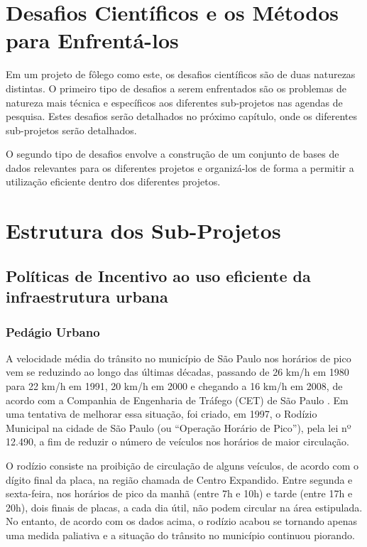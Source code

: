 \documentclass[
	12pt,				%
	openright,			%
	twoside,			%
	a4paper,			%
	english,			%
	french,				%
	spanish,			%
	brazil,				%
	]{abntex2}
\begin{document}
%

\chapter{Desafios Científicos e os Métodos para Enfrentá-los}

Em um projeto de fôlego como este, os desafios científicos são de duas naturezas distintas. O primeiro tipo de desafios a serem enfrentados são os problemas de natureza mais técnica e específicos aos diferentes sub-projetos nas agendas de pesquisa. Estes desafios serão detalhados no próximo capítulo, onde os diferentes sub-projetos serão detalhados.

O segundo tipo de desafios envolve a construção de um conjunto de bases de dados relevantes para os diferentes projetos e organizá-los de forma a permitir a utilização eficiente dentro dos diferentes projetos. 

\chapter{Estrutura dos Sub-Projetos}


\section{Políticas de Incentivo ao uso eficiente da infraestrutura urbana}



\subsection*{Pedágio Urbano}

A velocidade média do trânsito no município de São Paulo nos horários de pico vem se reduzindo ao longo das últimas décadas, passando de 26 km/h em 1980 para 22 km/h em 1991, 20 km/h em 2000 e chegando a 16 km/h em 2008, de acordo com a Companhia de Engenharia de Tráfego (CET) de São Paulo . Em uma tentativa de melhorar essa situação, foi criado, em 1997, o Rodízio Municipal na cidade de São Paulo (ou “Operação Horário de Pico”), pela lei  nº 12.490, a fim de reduzir o número de veículos nos horários de maior circulação.

O  rodízio consiste na proibição de circulação de alguns veículos, de acordo com o dígito final da placa, na região chamada de Centro Expandido. Entre segunda e sexta-feira, nos horários de pico da manhã (entre 7h e 10h) e tarde (entre 17h e 20h), dois finais de placas, a cada dia útil, não podem circular na área estipulada. No entanto, de acordo com os dados acima, o rodízio acabou se tornando apenas uma medida paliativa e a situação do trânsito no município continuou piorando.
\end{document}
